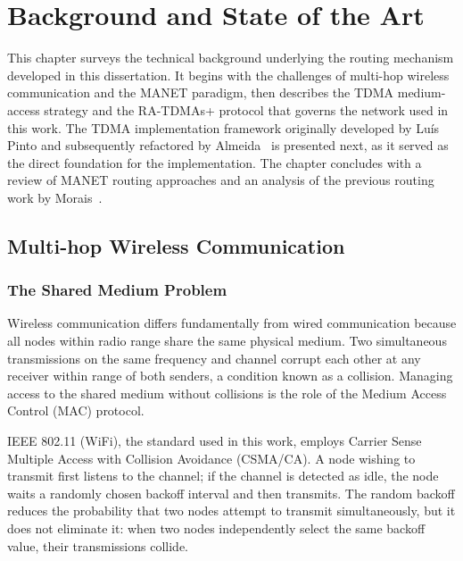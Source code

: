 
\chapter{Background and State of the Art}
\label{chap:background}

This chapter surveys the technical background underlying the routing mechanism
developed in this dissertation. It begins with the challenges of multi-hop
wireless communication and the MANET paradigm, then describes the TDMA
medium-access strategy and the RA-TDMAs+ protocol that governs the network
used in this work. The TDMA implementation framework originally developed by Luís Pinto and
subsequently refactored by Almeida~\cite{almeida2023synchronization} is
presented next, as it served as the direct foundation for the implementation. The chapter concludes with a
review of MANET routing approaches and an analysis of the previous routing
work by Morais~\cite{morais2024synchronization}.


\section{Multi-hop Wireless Communication}
\label{sec:wireless}

\subsection{The Shared Medium Problem}

Wireless communication differs fundamentally from wired communication because
all nodes within radio range share the same physical medium. Two simultaneous
transmissions on the same frequency and channel corrupt each other at any
receiver within range of both senders, a condition known as a collision.
Managing access to the shared medium without collisions is the role of the
Medium Access Control (MAC) protocol.

IEEE 802.11 (WiFi), the standard used in this work, employs Carrier Sense
Multiple Access with Collision Avoidance (CSMA/CA). A node wishing to
transmit first listens to the channel; if the channel is detected as idle,
the node waits a randomly chosen backoff interval and then transmits. The
random backoff reduces the probability that two nodes attempt to transmit
simultaneously, but it does not eliminate it: when two nodes independently
select the same backoff value, their transmissions collide.

